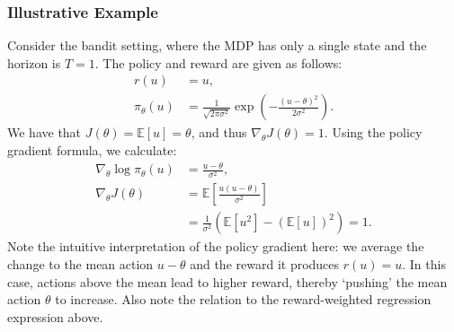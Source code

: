 \subsubsection{Illustrative Example}

Consider the bandit setting, where the MDP has only a single state and the horizon is $T=1$. The policy and reward are given as follows:
\begin{equation*}
    \begin{split}
        r(u) &= u, \\
        \pi_\theta(u) &= \frac{1}{\sqrt{2 \pi \sigma^2}} \exp (- \frac{(u - \theta)^2}{2 \sigma^2}).
    \end{split}
\end{equation*}
We have that $J(\theta) = \mathbb{E}[u] = \theta$, and thus $\nabla_\theta J(\theta) = 1.$
Using the policy gradient formula, we calculate:
\begin{equation*}
    \begin{split}
        \nabla_\theta \log \pi_\theta(u) &= \frac{u - \theta}{\sigma^2}, \\
        \nabla_\theta J(\theta) &= \mathbb{E} \left[\frac{u(u - \theta)}{\sigma^2}\right] \\
        &= \frac{1}{\sigma^2} (\mathbb{E} [u^2] - (\mathbb{E} [u])^2) = 1.
    \end{split}
\end{equation*}
Note the intuitive interpretation of the policy gradient here: we average the change to the mean action $u-\theta$ and the reward it produces $r(u)=u$. In this case, actions above the mean lead to higher reward, thereby `pushing' the mean action $\theta$ to increase. Also note the relation to the reward-weighted regression expression above.

